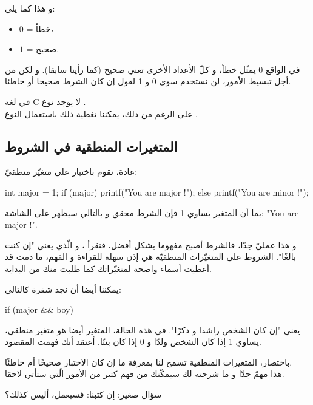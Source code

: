 و هذا كما يلي:

\begin{itemize}
	\item $ 0 $ = خطأ،
	\item $ 1 $ = صحيح.
\end{itemize}

في الواقع 0 يمثّل خطأ، و كلّ الأعداد الأخرى تعني صحيح (كما رأينا سابقا). و لكن من أجل تبسيط الأمور، لن نستخدم سوى 0 و 1 لقول إن كان الشرط صحيحا أو خاطئا.

في لغة
\textenglish{C}
 لا يوجد نوع
.\\
على الرغم من ذلك، يمكننا تغطية ذلك باستعمال النوع
.

\subsection{المتغيرات المنطقية في الشروط}

عادة، نقوم باختبار
على متغيّر منطقيّ:

\begin{Csource}
int major = 1;
if (major)
{
	printf("You are major !");
}
else {
	printf("You are minor !");
}
\end{Csource}

بما أن المتغير
يساوي 1 فإن الشرط محقق و بالتالي سيظهر على الشاشة:
"\textenglish{You are major !}".

و هذا عمليّ جدّا، فالشرط أصبح مفهوما بشكل أفضل، فنقرأ
،
و الّذي يعني "إن كنت بالغًا". الشروط على المتغيّرات المنطقيّة هي إذن سهلة للقراءة و الفهم، ما دمت قد أعطيت أسماء واضحة لمتغيّراتك كما طلبت منك من البداية.

يمكننا أيضا أن نجد شفرة كالتالي:

\begin{Csource}
if (major && boy)
\end{Csource}

يعني "إن كان الشخص راشدا و ذكرًا". في هذه الحالة، المتغير 
أيضا هو متغير منطقي، يساوي 1 إذا كان الشخص ولدًا و 0 إذا كان بنتًا. أعتقد أنك فهمت المقصود.

باختصار، المتغيرات المنطقية تسمح لنا بمعرفة ما إن كان الاختبار صحيحًا أم خاطئًا.\\
هذا مهمّ جدّا و ما شرحته لك سيمكّنك من فهم كثير من الأمور الّتي ستأتي لاحقا.

\begin{question}
سؤال صغير: إن كتبنا:
فسيعمل، أليس كذلك؟
\end{question}

